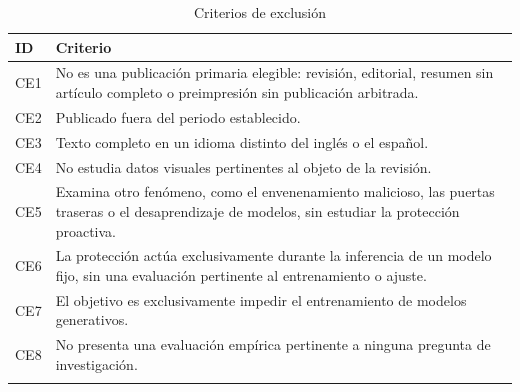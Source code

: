 \begin{table}[t]
\caption{Criterios de exclusión}\label{tab:exclusion}
\footnotesize
\begin{tabularx}{\textwidth}{@{}L{0.9cm}Y{1.0}@{}}
\toprule
ID & Criterio \\
\midrule
CE1 & No es una publicación primaria elegible: revisión, editorial, resumen sin artículo completo o preimpresión sin publicación arbitrada. \\
CE2 & Publicado fuera del periodo establecido. \\
CE3 & Texto completo en un idioma distinto del inglés o el español. \\
CE4 & No estudia datos visuales pertinentes al objeto de la revisión. \\
CE5 & Examina otro fenómeno, como el envenenamiento malicioso, las puertas traseras o el desaprendizaje de modelos, sin estudiar la protección proactiva. \\
CE6 & La protección actúa exclusivamente durante la inferencia de un modelo fijo, sin una evaluación pertinente al entrenamiento o ajuste. \\
CE7 & El objetivo es exclusivamente impedir el entrenamiento de modelos generativos. \\
CE8 & No presenta una evaluación empírica pertinente a ninguna pregunta de investigación. \\
\botrule
\end{tabularx}
\end{table}
